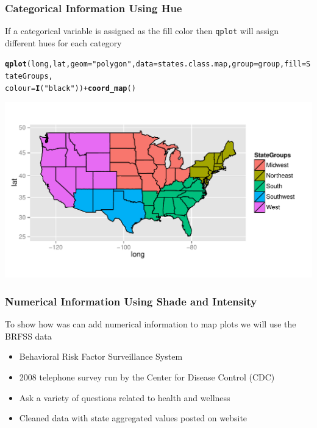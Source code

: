 \documentclass{beamer}\usepackage[]{graphicx}\usepackage[]{color}
\makeatletter
\newcommand{\hlstr}[1]{\textcolor[rgb]{0.192,0.494,0.8}{#1}}%
\newcommand{\hlopt}[1]{\textcolor[rgb]{0,0,0}{#1}}%
\newcommand{\hlstd}[1]{\textcolor[rgb]{0.345,0.345,0.345}{#1}}%
\newcommand{\hlkwc}[1]{\textcolor[rgb]{0.333,0.667,0.333}{#1}}%
\newcommand{\hlkwd}[1]{\textcolor[rgb]{0.737,0.353,0.396}{\textbf{#1}}}%
\newenvironment{kframe}{%
 \def\at@end@of@kframe{}%
 \ifinner\ifhmode%
  \def\at@end@of@kframe{\end{minipage}}%
  \begin{minipage}{\columnwidth}%
 \fi\fi%
 \def\FrameCommand##1{\hskip\@totalleftmargin \hskip-\fboxsep
 \colorbox{shadecolor}{##1}\hskip-\fboxsep
     \hskip-\linewidth \hskip-\@totalleftmargin \hskip\columnwidth}%
 \MakeFramed {\advance\hsize-\width
   \@totalleftmargin\z@ \linewidth\hsize
   \@setminipage}}%
 {\par\unskip\endMakeFramed%
 \at@end@of@kframe}
\newenvironment{knitrout}{}{} %
\makeatother
\begin{document}

\begin{frame}[fragile]
    \frametitle{Categorical Information Using Hue}
If a categorical variable is assigned as the fill color then \texttt{qplot} will assign different hues for each category
    
    \small
\begin{knitrout}\footnotesize
{}\color{fgcolor}\begin{kframe}
\begin{alltt}
\hlkwd{qplot}\hlstd{(long, lat,} \hlkwc{geom} \hlstd{=} \hlstr{"polygon"}\hlstd{,} \hlkwc{data} \hlstd{= states.class.map,} \hlkwc{group} \hlstd{= group,} \hlkwc{fill} \hlstd{= StateGroups,}
    \hlkwc{colour} \hlstd{=} \hlkwd{I}\hlstd{(}\hlstr{"black"}\hlstd{))} \hlopt{+} \hlkwd{coord_map}\hlstd{()}
\end{alltt}
\end{kframe}
\includegraphics[width=\textwidth]{figure/kstatescolored} 

\end{knitrout}

    \normalsize
\end{frame}


\begin{frame}
    \frametitle{Numerical Information Using Shade and Intensity}
    
    To show how was can add numerical information to map plots we will use the BRFSS data
    
    \begin{itemize}
        \item Behavioral Risk Factor Surveillance System
        \item 2008 telephone survey run by the Center for Disease Control (CDC)
        \item Ask a variety of questions related to health and wellness
        \item Cleaned data with state aggregated values posted on website
    \end{itemize}    
\end{frame}
\end{document}
